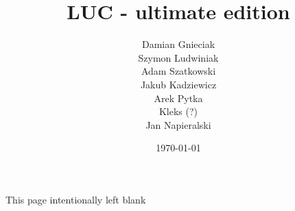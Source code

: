 \documentclass[titlepage]{article}
\title{LUC - ultimate edition}
\date{\today}
\author{Damian Gnieciak \\ Szymon Ludwiniak \\ Adam Szatkowski \\ Jakub Kadziewicz \\ Arek Pytka \\ Kleks (?) \\ Jan Napieralski}
\begin{document}
\begin{titlepage} 
    \maketitle 
\end{titlepage}

\newpage

\tableofcontents

\newpage

\hspace{0px}
\vfill
    \begin{center}
        This page intentionally left blank
    \end{center}
\vfill

\newpage



\newpage



\newpage



\newpage



\newpage



\newpage



\newpage



\newpage



\newpage



\newpage



\newpage


\end{document}
